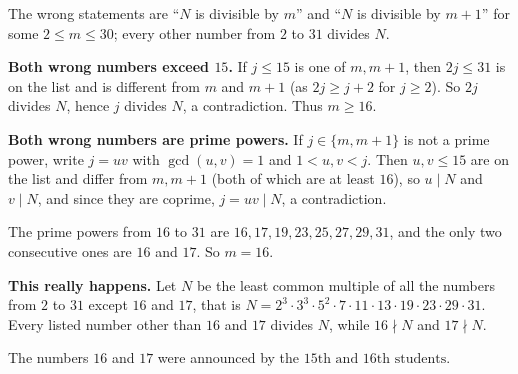 The wrong statements are ``$N$ is divisible by $m$'' and ``$N$ is divisible by $m+1$'' for some $2\le m\le30$; every other number from $2$ to $31$ divides $N$.

\textbf{Both wrong numbers exceed $15$.} If $j\le15$ is one of $m,m+1$, then $2j\le31$ is on the list and is different from $m$ and $m+1$ (as $2j\ge j+2$ for $j\ge2$). So $2j$ divides $N$, hence $j$ divides $N$, a contradiction. Thus $m\ge16$.

\textbf{Both wrong numbers are prime powers.} If $j\in\{m,m+1\}$ is not a prime power, write $j=uv$ with $\gcd(u,v)=1$ and $1<u,v<j$. Then $u,v\le15$ are on the list and differ from $m,m+1$ (both of which are at least $16$), so $u\mid N$ and $v\mid N$, and since they are coprime, $j=uv\mid N$, a contradiction.

The prime powers from $16$ to $31$ are $16,17,19,23,25,27,29,31$, and the only two consecutive ones are $16$ and $17$. So $m=16$.

\textbf{This really happens.} Let $N$ be the least common multiple of all the numbers from $2$ to $31$ except $16$ and $17$, that is $N=2^3\cdot3^3\cdot5^2\cdot7\cdot11\cdot13\cdot19\cdot23\cdot29\cdot31$. Every listed number other than $16$ and $17$ divides $N$, while $16\nmid N$ and $17\nmid N$.

The numbers $16$ and $17$ were announced by the $\boxed{15\text{th and }16\text{th students}}$.
